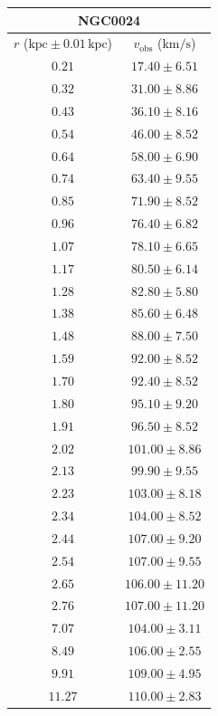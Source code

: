 \documentclass{article}
\newcommand\kpc{\textrm{kpc}}
\newcommand\kmps{\textrm{km}/\textrm{s}}
\newcommand\vobs{\ensuremath{v_{\textrm{obs}}}}
\begin{document}
\singlespacing

\begin{table}[h!]
    \begin{tabular}{|c|c|}
        \hline
        \multicolumn{2}{|c|}{NGC0024} \\
        \hline
        $r$ ($\kpc \pm 0.01 \,\kpc$) & $\vobs$ ($\kmps$) \\
        \hline
        $0.21$ & $17.40 \pm 6.51$ \\
        $0.32$ & $31.00 \pm 8.86$ \\
        $0.43$ & $36.10 \pm 8.16$ \\
        $0.54$ & $46.00 \pm 8.52$ \\
        $0.64$ & $58.00 \pm 6.90$ \\
        $0.74$ & $63.40 \pm 9.55$ \\
        $0.85$ & $71.90 \pm 8.52$ \\
        $0.96$ & $76.40 \pm 6.82$ \\
        $1.07$ & $78.10 \pm 6.65$ \\
        $1.17$ & $80.50 \pm 6.14$ \\
        $1.28$ & $82.80 \pm 5.80$ \\
        $1.38$ & $85.60 \pm 6.48$ \\
        $1.48$ & $88.00 \pm 7.50$ \\
        $1.59$ & $92.00 \pm 8.52$ \\
        $1.70$ & $92.40 \pm 8.52$ \\
        $1.80$ & $95.10 \pm 9.20$ \\
        $1.91$ & $96.50 \pm 8.52$ \\
        $2.02$ & $101.00 \pm 8.86$ \\
        $2.13$ & $99.90 \pm 9.55$ \\
        $2.23$ & $103.00 \pm 8.18$ \\
        $2.34$ & $104.00 \pm 8.52$ \\
        $2.44$ & $107.00 \pm 9.20$ \\
        $2.54$ & $107.00 \pm 9.55$ \\
        $2.65$ & $106.00 \pm 11.20$ \\
        $2.76$ & $107.00 \pm 11.20$ \\
        $7.07$ & $104.00 \pm 3.11$ \\
        $8.49$ & $106.00 \pm 2.55$ \\
        $9.91$ & $109.00 \pm 4.95$ \\
        $11.27$ & $110.00 \pm 2.83$ \\
        \hline
    \end{tabular}
\end{table}
\end{document}
